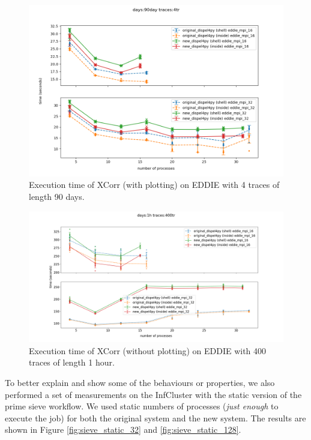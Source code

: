 \begin{figure}[h]
\centering
    \includegraphics[width=1.10\textwidth]{figures/xcorr_eddie_90day_4tr}
\caption{Execution time of XCorr (with plotting) on EDDIE with 4 traces of length 90 days.}
\label{fig:xcorr_eddie}
\end{figure}

\begin{figure}[h]
\centering
    \includegraphics[width=1\textwidth]{figures/xcorr_eddie_1h_400tr}
\caption{Execution time of XCorr (without plotting) on EDDIE with 400 traces of length 1 hour.}
\label{fig:xcorr_eddie_400}
\end{figure}

To better explain and show some of the behaviours or properties, we also performed a set of measurements on the InfCluster with the static version of the prime sieve workflow. We used static numbers of processes (\emph{just enough} to execute the job) for both the original system and the new system. The results are shown in Figure  \ref{fig:sieve_static_32} and \ref{fig:sieve_static_128}.

